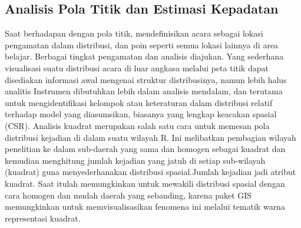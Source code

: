 \subsection{Analisis Pola Titik dan Estimasi Kepadatan}
Saat berhadapan dengan pola titik, mendefinisikan acara sebagai lokasi pengamatan dalam distribusi, dan poin seperti semua lokasi lainnya di area belajar. Berbagai tingkat pengamatan dan analisis diajukan. Yang sederhana visualisasi suatu distribusi acara di luar angkasa melalui peta titik dapat disediakan informasi awal mengenai struktur distribusinya, namun lebih halus analitis Instrumen dibutuhkan lebih dalam analisis mendalam, dan terutama untuk mengidentifikasi kelompok atau keteraturan dalam distribusi relatif terhadap model yang diasumsikan, biasanya yang lengkap keacakan spasial (CSR).
Analisis kuadrat merupakan salah satu cara untuk memesan pola distribusi kejadian di dalam suatu wilayah R. Ini melibatkan pembagian wilayah penelitian ke dalam sub-daerah yang sama dan homogen sebagai kuadrat dan kemudian menghitung jumlah kejadian yang jatuh di setiap sub-wilayah (kuadrat) guna menyederhanakan distribusi spasial.Jumlah kejadian jadi atribut kuadrat. Saat itulah memungkinkan untuk mewakili distribusi spasial dengan cara homogen dan mudah daerah yang sebanding, karena paket GIS memungkinkan untuk memvisualisasikan fenomena ini melalui tematik warna representasi kuadrat.
